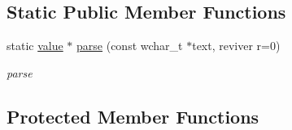 \subsection*{Static Public Member Functions}
\begin{DoxyCompactItemize}
\item 
static \hyperlink{classformat_1_1value_aa6b85823936bf7b8ab78d3f8d443c00d}{value} $\ast$ \hyperlink{classformat_1_1json_ad99f1cac9b2ae0d67214228a4fd2469b}{parse} (const wchar\+\_\+t $\ast$text, reviver r=0)
\begin{DoxyCompactList}\small\item\em parse \end{DoxyCompactList}\end{DoxyCompactItemize}
\subsection*{Protected Member Functions}
